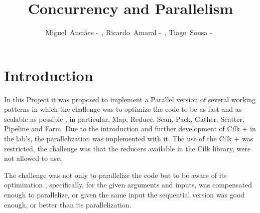 \documentclass[10pt,journal,compsoc]{IEEEtran}
\begin{document}
\title{Concurrency and Parallelism}

\author{Miguel~Anci\~aes -~, Ricardo~Amaral -~, Tiago~Sousa -~%
}

    

\IEEEdisplaynontitleabstractindextext

\IEEEpeerreviewmaketitle

\maketitle

\section{Introduction}
In this Project it was proposed to implement a Parallel version of several working patterns in which the challenge was to optimize the code to be as fast and as scalable as possible , in particular, Map, Reduce, Scan, Pack, Gather, Scatter, Pipeline and Farm. Due to the introduction and further development of Cilk + in the lab's, the parallelization was implemented with it. The use of the Cilk + was restricted, the challenge was that the reducers available in the Cilk library, were not allowed to use.
    
The challenge was not only to parallelize the code but to be aware of its optimization , specifically, for the given arguments and inputs, was compensated enough to parallelize, or given the same input the sequential version was good enough, or better than its parallelization. 
    
\end{document}
